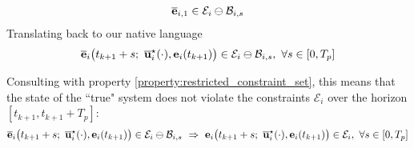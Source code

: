 \begin{gg_box}
\begin{align}
  \overline{\bm{\mathbf{e}}}_{i,1} \in \mathcal{E}_i \ominus \mathcal{B}_{i,s}
\end{align}
Translating back to our native language
\begin{align}
  \overline{\vect{e}}_i\big(t_{k+1} + s;\ \overline{\vect{u}}_i^{\star}(\cdot), \vect{e}_i(t_{k+1})\big) \in \mathcal{E}_i \ominus \mathcal{B}_{i,s},\
  \forall s \in [0,T_p]
  \label{eq:feasibility_2}
\end{align}
\begin{remark}
Consulting with property \eqref{property:restricted_constraint_set}, this means
that the state of the ``true" system does not violate the constraints $\mathcal{E}_i$
over the horizon $[t_{k+1}, t_{k+1} + T_p]$:
\begin{align}
  \overline{\vect{e}}_i\big(t_{k+1} + s;\ \overline{\vect{u}}_i^{\star}(\cdot), \vect{e}_i(t_{k+1})\big) \in \mathcal{E}_i \ominus \mathcal{B}_{i,s}\
    \Rightarrow\
    \vect{e}_i\big(t_{k+1} + s;\ \overline{\vect{u}}_i^{\star}(\cdot), \vect{e}_i(t_{k+1})\big) \in \mathcal{E}_i,\ \forall s \in [0,T_p]
    \label{eq:feasibility_with_disturbance_second_point}
\end{align}
\end{remark}
\qedsymbol
\end{gg_box}

